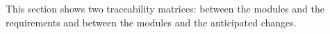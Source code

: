 \documentclass[12pt, titlepage]{article}
\newcommand{\acref}[1]{AC\ref{#1}}
\newcommand{\mref}[1]{M\ref{#1}}
\begin{document}
This section shows two traceability matrices: between the modules and the
requirements and between the modules and the anticipated changes.

%  
\end{document}
